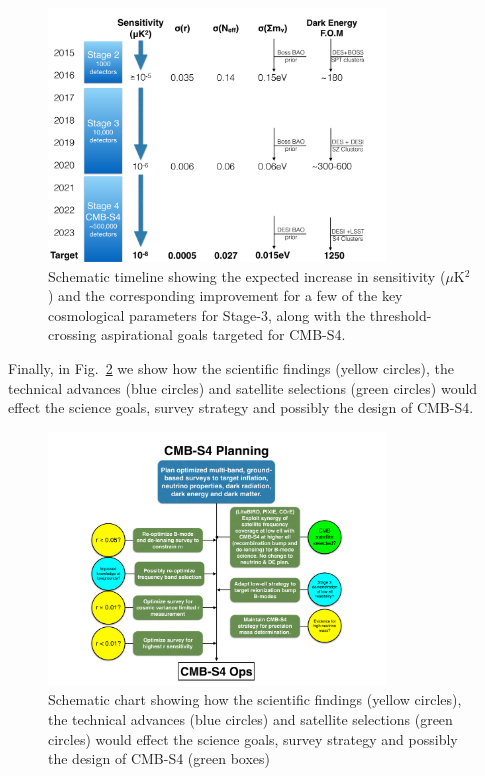 
\begin{figure}[t]
\centering \includegraphics[width=0.8\textwidth]{Intro/Fig-FlowChart1_v1.pdf}
\vskip 10pt \caption{Schematic timeline showing the expected increase in sensitivity ($\mu$K$^2$) and the corresponding improvement for a few of the key cosmological parameters for Stage-3, along with the threshold-crossing aspirational goals targeted for CMB-S4.}
\label{fig:science_timeline-intro}
\end{figure}

Finally, in Fig.~\ref{fig:flowchart} we show how the scientific findings (yellow circles), the technical advances (blue circles) and satellite selections (green circles) would effect the science goals, survey strategy and possibly the design of CMB-S4.

\begin{figure}[ht]
\centering \includegraphics[trim=1in 0in 1.2in 0in, clip, width=0.8\textwidth,]{Intro/Fig-FlowChart2_v1.pdf}
\caption{Schematic chart showing how the scientific findings (yellow circles), the technical advances (blue circles) and satellite selections (green circles) would effect the science goals, survey strategy and possibly the design of CMB-S4 (green boxes)}
\label{fig:flowchart}
\end{figure}



%



